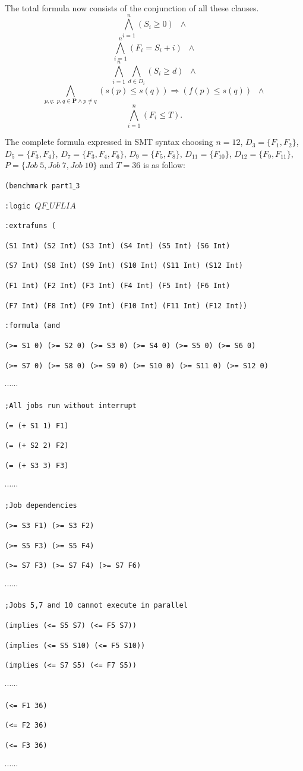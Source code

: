 The total formula now consists of the conjunction of all these clauses.
\[ \bigwedge_{i=1}^n (S_{i} \geq 0)\;\;\wedge\]
\[ \bigwedge_{i=1}^n (F_{i} = S_{i} + i)\;\;\wedge\]
\[ \bigwedge_{i=1}^n \bigwedge_{d \in D_{i}} (S_{i} \geq d)\;\;\wedge\]
\[ \bigwedge_{p,q: \; p,q \in \textbf{P} \land p \neq q} (s(p) \leq s(q)) \Rightarrow (f(p) \leq s(q)) \;\;\wedge\]
\[ \bigwedge_{i=1}^n (F_{i} \leq T).\]


The complete formula expressed in SMT syntax choosing $n=12$, $D_{3} = \{ F_{1}, F_{2} \}$, $D_{5} = \{F_{3}, F_{4}\}$, $D_{7} = \{F_{3}, F_{4}, F_{6}\}$, $D_{9} = \{F_{5}, F_{8}\}$, $D_{11} = \{F_{10}\}$, $D_{12} = \{F_{9}, F_{11}\}$, $P = \{Job\;5, Job\;7, Job\;10\}$ and $T = 36$ is as follow:

{\footnotesize

{\tt (benchmark part1$\_$3}

{\tt :logic $QF\_UFLIA$}

{\tt :extrafuns (}

{\tt (S1 Int) (S2 Int) (S3 Int) (S4 Int)  (S5 Int)  (S6 Int)}

{\tt (S7 Int) (S8 Int) (S9 Int) (S10 Int) (S11 Int) (S12 Int)}

{\tt (F1 Int) (F2 Int) (F3 Int) (F4 Int)  (F5 Int)  (F6 Int)}

{\tt (F7 Int) (F8 Int) (F9 Int) (F10 Int) (F11 Int) (F12 Int))}

{\tt :formula (and}

{\tt (>= S1 0) (>= S2 0) (>= S3 0) (>= S4 0)  (>= S5 0)  (>= S6 0)}

{\tt (>= S7 0) (>= S8 0) (>= S9 0) (>= S10 0) (>= S11 0) (>= S12 0)}

$\cdots \cdots$

{\tt ;All jobs run without interrupt}

{\tt (= (+ S1 1) F1)}

{\tt (= (+ S2 2) F2)}

{\tt (= (+ S3 3) F3)}

$\cdots \cdots$

{\tt ;Job dependencies}

{\tt  (>= S3 F1)  (>= S3 F2)}

{\tt  (>= S5 F3)  (>= S5 F4)}

{\tt (>= S7 F3)  (>= S7 F4) (>= S7 F6)}

$\cdots \cdots$

{\tt ;Jobs 5,7 and 10 cannot execute in parallel}

{\tt (implies (<= S5 S7)   (<= F5 S7))}

{\tt (implies (<= S5 S10)  (<= F5 S10))}

{\tt (implies (<= S7 S5)   (<= F7 S5))}

$\cdots \cdots$

{\tt (<= F1 36)}

{\tt (<= F2 36)}

{\tt (<= F3 36)}

$\cdots \cdots$
}

